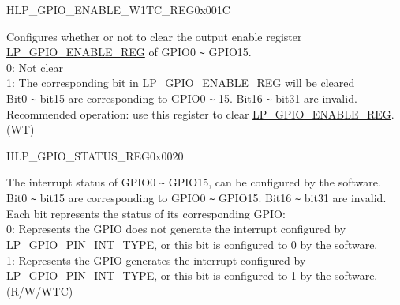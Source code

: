 \begin{register}{H}{LP\_GPIO\_ENABLE\_W1TC\_REG}{0x001C}\label{regdesc:LPGPIOENABLEW1TCREG}
%
%
\regnewline%
\begin{regdesc}\begin{reglist}
\label{fielddesc:LPGPIOENABLEDATAW1TC}\item [LP\_GPIO\_ENABLE\_DATA\_W1TC] Configures whether or not to clear the output enable register \hyperref[regdesc:LPGPIOENABLEREG]{LP\_GPIO\_ENABLE\_REG} of GPIO0 \verb+~+ GPIO15. \\
0: Not clear\\
1: The corresponding bit in \hyperref[regdesc:LPGPIOENABLEREG]{LP\_GPIO\_ENABLE\_REG} will be cleared\\
Bit0 \verb+~+ bit15 are corresponding to GPIO0 \verb+~+ 15. Bit16 \verb+~+ bit31 are invalid. Recommended operation: use this register to clear \hyperref[regdesc:LPGPIOENABLEREG]{LP\_GPIO\_ENABLE\_REG}.\\
(WT)
\end{reglist}\end{regdesc}
\end{register}


\begin{register}{H}{LP\_GPIO\_STATUS\_REG}{0x0020}\label{regdesc:LPGPIOSTATUSREG}
%
%
\regnewline%
\begin{regdesc}\begin{reglist}
\label{fielddesc:LPGPIOSTATUSDATA}\item [LP\_GPIO\_STATUS\_DATA]  The interrupt status of GPIO0 \verb+~+ GPIO15, can be configured by the software. \\
Bit0 \verb+~+ bit15 are corresponding to GPIO0 \verb+~+ GPIO15. Bit16 \verb+~+ bit31 are invalid. \\
Each bit represents the status of its corresponding GPIO:\\
0: Represents the GPIO does not generate the interrupt configured by \hyperref[fielddesc:LPGPIOPINNINTTYPE]{LP\_GPIO\_PIN\_INT\_TYPE}, or this bit is configured to 0 by the software.\\
1: Represents the GPIO generates the interrupt configured by \hyperref[fielddesc:LPGPIOPINNINTTYPE]{LP\_GPIO\_PIN\_INT\_TYPE}, or this bit is configured to 1 by the software.\\
(R/W/WTC)
\end{reglist}\end{regdesc}
\end{register}


